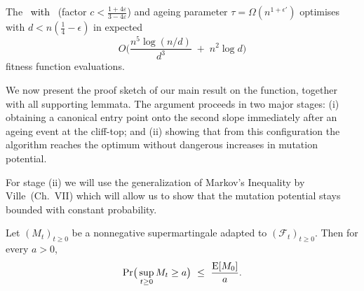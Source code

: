 
\begin{theorem}\label{th:expoHD-cliff}
	The %
	\textcolor{black}{\firstBest~with} \linHD\ (factor $c<\tfrac{1+4\varepsilon}{3-4\varepsilon}$) and ageing parameter $\tau=\Omega(n^{1+\epsilon'})$
	optimises \cliff{} with $d<n(\tfrac{1}{4}-\epsilon)$ in expected
	\[
	O\!\Big(\frac{n^{5}\log(n/d)}{d^{3}} \;+\; n^{2}\log d\Big)
	\]
	fitness function evaluations.
\end{theorem}


We now present the proof sketch of our main result on the  \cliff{} function, together with 
all supporting lemmata.  %
The argument proceeds in two 
major stages: (i) obtaining a canonical entry point onto the second slope 
immediately after an ageing event at the cliff-top; and (ii) showing that from 
this configuration the algorithm reaches the optimum without dangerous increases in mutation potential.

For stage (ii) we will use the generalization of Markov's Inequality by Ville~\cite{Doob1953}(Ch.~VII) which will allow us to show that the mutation potential stays bounded with constant probability.
\begin{theorem}\label{thm:ville}
	Let $(M_t)_{t\ge 0}$ be a nonnegative supermartingale adapted to $(\mathcal F_t)_{t\ge 0}$. 
	Then for every $a>0$,
	\[
	\Pr\!\big(\sup_{t\ge 0} M_t \ge a\big)\ \le\ \frac{\EE[M_0]}{a}.
	\]
\end{theorem}



